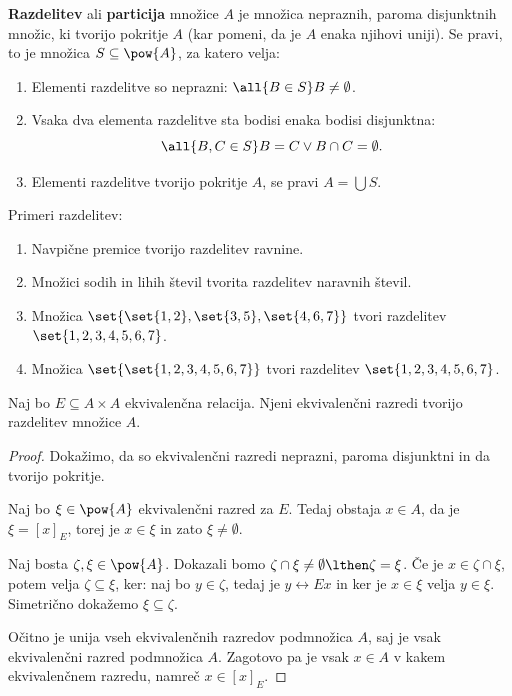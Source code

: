 \begin{definicija}
  \textbf{Razdelitev} ali \textbf{particija} množice $A$ je množica nepraznih, paroma
  disjunktnih množic, ki tvorijo pokritje $A$ (kar pomeni, da je $A$ enaka njihovi uniji). Se
  pravi, to je množica $S \subseteq \pow{A}$, za katero velja:
  \begin{enumerate}
  \item Elementi razdelitve so neprazni: $\all{B \in S} B \neq \emptyset$.
  \item Vsaka dva elementa razdelitve sta bodisi enaka bodisi disjunktna:
    \begin{equation*}
      \all{B, C \in S} B = C \lor B \cap C = \emptyset.
    \end{equation*}
  \item Elementi razdelitve tvorijo pokritje $A$, se pravi $A = \bigcup S$.
  \end{enumerate}
\end{definicija}

\begin{zgled}
  Primeri razdelitev:
  \begin{enumerate}
  \item Navpične premice tvorijo razdelitev ravnine.
  \item Množici sodih in lihih števil tvorita razdelitev naravnih števil.
  \item Množica $\set{\set{1,2}, \set{3,5}, \set{4,6,7}}$ tvori razdelitev $\set{1,2,3,4,5,6,7}$.
  \item Množica $\set{\set{1,2,3,4,5,6,7}}$ tvori razdelitev $\set{1,2,3,4,5,6,7}$.
  \end{enumerate}
\end{zgled}

\begin{izrek}
  Naj bo $E \subseteq A \times A$ ekvivalenčna relacija. Njeni ekvivalenčni razredi tvorijo
  razdelitev množice $A$.
\end{izrek}

\begin{proof}
  Dokažimo, da so ekvivalenčni razredi neprazni, paroma disjunktni in da tvorijo pokritje.

  Naj bo $\xi \in \pow{A}$ ekvivalenčni razred za $E$. Tedaj obstaja $x \in A$, da je $\xi = [x]_E$,
  torej je $x \in \xi$ in zato $\xi \neq \emptyset$.

  Naj bosta $\zeta, \xi \in \pow{A}$. Dokazali bomo $\zeta \cap \xi \neq \emptyset \lthen \zeta = \xi$. Če je $x \in \zeta \cap \xi$, potem velja $\zeta \subseteq \xi$, ker: naj bo $y \in \zeta$, tedaj je $y \rel{E} x$ in ker je $x \in \xi$ velja $y \in \xi$. Simetrično dokažemo $\xi \subseteq \zeta$.

  Očitno je unija vseh ekvivalenčnih razredov podmnožica $A$, saj je vsak ekvivalenčni razred podmnožica $A$. Zagotovo
  pa je vsak $x \in A$ v kakem ekvivalenčnem razredu, namreč $x \in [x]_E$.
\end{proof}

